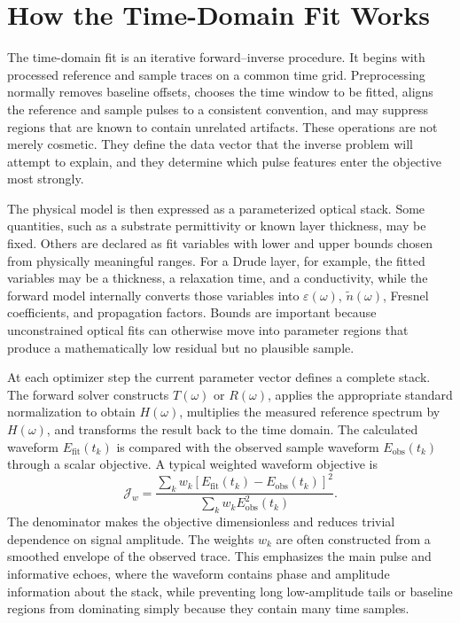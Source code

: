 \documentclass[11pt]{article}
\newcommand{\efit}{E_{\mathrm{fit}}}
\newcommand{\eobs}{E_{\mathrm{obs}}}
\newcommand{\eps}{\varepsilon}
\newcommand{\nt}{\tilde{n}}
\newcommand{\Jw}{\mathcal{J}_{w}}
\begin{document}
\section{How the Time-Domain Fit Works}

The time-domain fit is an iterative forward--inverse procedure. It begins with processed reference and sample traces on a common time grid. Preprocessing normally removes baseline offsets, chooses the time window to be fitted, aligns the reference and sample pulses to a consistent convention, and may suppress regions that are known to contain unrelated artifacts. These operations are not merely cosmetic. They define the data vector that the inverse problem will attempt to explain, and they determine which pulse features enter the objective most strongly.

The physical model is then expressed as a parameterized optical stack. Some quantities, such as a substrate permittivity or known layer thickness, may be fixed. Others are declared as fit variables with lower and upper bounds chosen from physically meaningful ranges. For a Drude layer, for example, the fitted variables may be a thickness, a relaxation time, and a conductivity, while the forward model internally converts those variables into \(\eps(\omega)\), \(\nt(\omega)\), Fresnel coefficients, and propagation factors. Bounds are important because unconstrained optical fits can otherwise move into parameter regions that produce a mathematically low residual but no plausible sample.

At each optimizer step the current parameter vector defines a complete stack. The forward solver constructs \(T(\omega)\) or \(R(\omega)\), applies the appropriate standard normalization to obtain \(H(\omega)\), multiplies the measured reference spectrum by \(H(\omega)\), and transforms the result back to the time domain. The calculated waveform \(\efit(t_k)\) is compared with the observed sample waveform \(\eobs(t_k)\) through a scalar objective. A typical weighted waveform objective is
\begin{equation}
  \Jw
  =
  \frac{
    \sum_k w_k\left[\efit(t_k)-\eobs(t_k)\right]^2
  }{
    \sum_k w_k\eobs^2(t_k)
  } .
  \label{eq:weighted_objective}
\end{equation}
The denominator makes the objective dimensionless and reduces trivial dependence on signal amplitude. The weights \(w_k\) are often constructed from a smoothed envelope of the observed trace. This emphasizes the main pulse and informative echoes, where the waveform contains phase and amplitude information about the stack, while preventing long low-amplitude tails or baseline regions from dominating simply because they contain many time samples.
\end{document}
